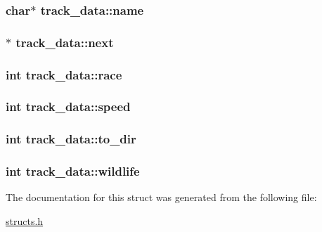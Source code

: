 \hypertarget{structtrack__data_ab9e6413e572c2f0d708ffc27fd8948ec}{
\subsubsection[{name}]{\setlength{\rightskip}{0pt plus 5cm}char$\ast$ track\-\_\-data\-::name}}\label{structtrack__data_ab9e6413e572c2f0d708ffc27fd8948ec}
\hypertarget{structtrack__data_a5211c02aba386a1c120235dcc6333916}{
\subsubsection[{next}]{$\ast$ track\-\_\-data\-::next}}\label{structtrack__data_a5211c02aba386a1c120235dcc6333916}
\hypertarget{structtrack__data_a5de35871ef6b761e649af2b77452c392}{
\subsubsection[{race}]{\setlength{\rightskip}{0pt plus 5cm}int track\-\_\-data\-::race}}\label{structtrack__data_a5de35871ef6b761e649af2b77452c392}
\hypertarget{structtrack__data_a36a4f55640b09422b99d3d096bd03153}{
\subsubsection[{speed}]{\setlength{\rightskip}{0pt plus 5cm}int track\-\_\-data\-::speed}}\label{structtrack__data_a36a4f55640b09422b99d3d096bd03153}
\hypertarget{structtrack__data_afcae154543b99595a718f7eae7c64871}{
\subsubsection[{to\-\_\-dir}]{\setlength{\rightskip}{0pt plus 5cm}int track\-\_\-data\-::to\-\_\-dir}}\label{structtrack__data_afcae154543b99595a718f7eae7c64871}
\hypertarget{structtrack__data_aa59f6165884a647bc84e7d94ecda164f}{
\subsubsection[{wildlife}]{\setlength{\rightskip}{0pt plus 5cm}int track\-\_\-data\-::wildlife}}\label{structtrack__data_aa59f6165884a647bc84e7d94ecda164f}


The documentation for this struct was generated from the following file\-:\begin{DoxyCompactItemize}
\item 
\hyperlink{structs_8h}{structs.\-h}\end{DoxyCompactItemize}
